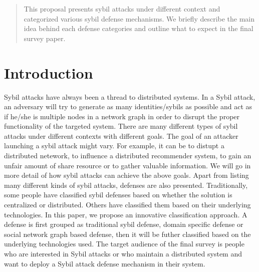 \documentclass[conference]{IEEEtran}
\begin{document}
\begin{abstract}
This  proposal presents sybil attacks under different context and categorized various sybil defense mechanisms. 
We briefly describe the main idea behind each defense categories and outline what to expect in the final survey paper. 
\end{abstract}





%
\IEEEpeerreviewmaketitle



\section{Introduction}

Sybil attacks have always been a thread to distributed systems.
In a Sybil attack, an adversary will try to generate as many identities/sybils as possible and act as if he/she is multiple nodes in a network graph in order to disrupt the proper functionality of the targeted system. 
There are many different types of sybil attacks under different contexts with different goals. 
The goal of an attacker launching a sybil attack might vary. For example, it can be to distupt a distributed netework, to influence a distributed recommender system, to gain an unfair amount of share resource or to gather valuable information.
We will go in more detail of how sybil attacks can achieve the above goals. Apart from listing many different kinds of sybil attacks, defenses are also presented.
Traditionally, some people have classified sybil defenses based on whether the solution is centralized or distributed.
Others have classified them based on their underlying technologies. In this paper, we propose an innovative classification approach. 
A defense is first grouped as traditional sybil defense, domain specific defense or social network graph based defense, then it will be futher classified based on the underlying technologies used. The target audience of the final survey is people who are interested in Sybil attacks or who maintain a distributed system and want to deploy a Sybil attack defense mechanism in their system.
\end{document}
